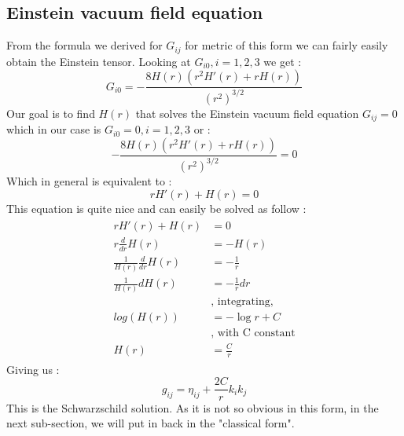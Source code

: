 \documentclass[a4paper,12pt]{article}
\theoremstyle{definition}
\begin{document}
\subsection{Einstein vacuum field equation}
From the formula we derived for $G_{ij}$ for metric of this form we can fairly easily obtain the Einstein tensor.
Looking at $G_{i0}, i=1,2,3$ we get :
\begin{equation}
	G_{i0}=-\frac{8 H(r) (r^2 H'(r)+rH(r))}{(r^2)^{3/2}}
\end{equation}
Our goal is to find $H(r)$ that solves the Einstein vacuum field equation $G_{ij}=0$ which in our case is $G_{i0}=0, i=1,2,3$ or :
\begin{equation}
	-\frac{8 H(r) (r^2 H'(r)+rH(r))}{(r^2)^{3/2}}=0
\end{equation}
Which in general is equivalent to :
\begin{equation}
	rH'(r)+H(r)=0
\end{equation}
This equation is quite nice and can easily be solved as follow :
\begin{align}
\begin{split}
	rH'(r)+H(r)&=0\\
	r\frac{d}{dr}H(r)&=-H(r)\\
	\frac{1}{H(r)}\frac{d}{dr}H(r)&=-\frac{1}{r}\\
	\frac{1}{H(r)}dH(r)&=-\frac{1}{r}dr \;\\
	&\text{, integrating,}\\
	log(H(r))&=-\log{r}+C \;\\
	&\text{, with C constant}\\
	H(r)&=\frac{C}{r}
\end{split}
\end{align}
Giving us :
\begin{equation}
	g_{ij}=\eta_{ij}+\frac{2C}{r}k_ik_j
\end{equation}
This is the Schwarzschild solution. As it is not so obvious in this form, in the next sub-section, we will put in back in the "classical form".
\end{document}

